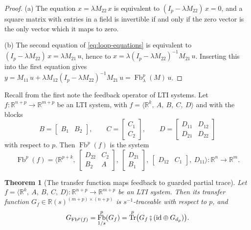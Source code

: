 \documentclass[11pt,a4paper]{article}
\theoremstyle{plain}
\newtheorem{theorem}{Theorem}
\theoremstyle{definition}
\theoremstyle{remark}
\DeclareMathOperator{\Fb}{Fb}
\DeclareMathOperator{\Tr}{Tr}
\newcommand{\R}{\mathbb{R}}
\newcommand{\Rs}{\mathbb{R}(s)}
\newcommand{\id}{\mathrm{id}}
\newcommand{\then}{\mathbin{\fatsemi}}
\newcommand{\sys}[5]{\bigl\langle #1,\ #2,\ #3,\ #4,\ #5 \bigr\rangle}
\begin{document}
\begin{proof}
    (a) The equation $x = \lambda M_{22}\, x$ is equivalent to $(I_p - \lambda M_{22})\, x = 0$, and a square matrix with entries in a field is invertible if and only if the zero vector is the only vector which it maps to zero.

    (b) The second equation of \cref{eq:loop-equations} is equivalent to $(I_p - \lambda M_{22})\, x = \lambda M_{21}\, u$, hence to $x = \lambda (I_p - \lambda M_{22})^{-1} M_{21}\, u$.
    Inserting this into the first equation gives $y = M_{11}\, u + \lambda M_{12} (I_p - \lambda M_{22})^{-1} M_{21}\, u = \Fb^p_\lambda(M)\, u$.
\end{proof}

Recall from the first note the feedback operator of LTI systems.
Let $f \colon \R^{n+p} \to \R^{m+p}$ be an LTI system, with $f = \sys{\R^k}{A}{B}{C}{D}$ and with the blocks
\begin{equation}
    \label{eq:lti-blocks}
    B = \begin{bmatrix} B_1 & B_2 \end{bmatrix},
    \qquad
    C = \begin{bmatrix} C_1 \\ C_2 \end{bmatrix},
    \qquad
    D = \begin{bmatrix} D_{11} & D_{12} \\ D_{21} & D_{22} \end{bmatrix}
\end{equation}
with respect to $p$.
Then $\Fb^p(f)$ is the system
\begin{equation}
    \label{eq:fb-lti}
    \Fb^p(f) = \sys{\R^{p+k}}
    {\begin{bmatrix} D_{22} & C_2 \\ B_2 & A \end{bmatrix}}
    {\begin{bmatrix} D_{21} \\ B_1 \end{bmatrix}}
    {\begin{bmatrix} D_{12} & C_1 \end{bmatrix}}
    {D_{11}}
    \colon \R^n \to \R^m .
\end{equation}

\begin{theorem}[The transfer function maps feedback to guarded partial trace]
    \label{thm:transfer}
    Let $f = \sys{\R^k}{A}{B}{C}{D} \colon \R^{n+p} \to \R^{m+p}$ be an LTI system.
    Then its transfer function $G_f \in \Rs^{(m+p) \times (n+p)}$ is $s^{-1}$-traceable with respect to $p$, and
    \begin{equation}
        \label{eq:transfer-theorem}
        G_{\Fb^p(f)} = \Fb^p_{1/s}(G_f) = \Tr^p\bigl( G_f \then (\id \oplus G_{d_p}) \bigr) .
    \end{equation}
\end{theorem}
\end{document}
